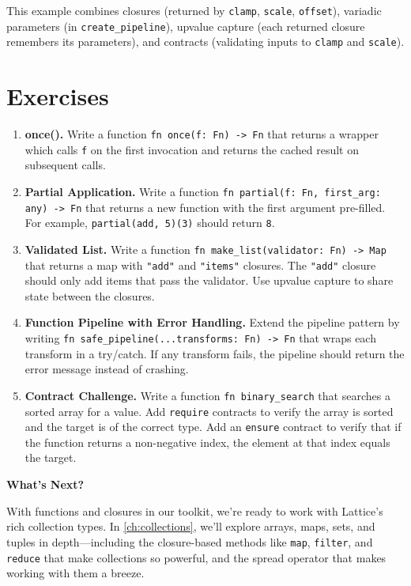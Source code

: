 This example combines closures (returned by \lstinline|clamp|, \lstinline|scale|, \lstinline|offset|), variadic parameters (in \lstinline|create_pipeline|), upvalue capture (each returned closure remembers its parameters), and contracts (validating inputs to \lstinline|clamp| and \lstinline|scale|).

\section{Exercises}\label{sec:functions-exercises}

\begin{enumerate}
  \item \textbf{once().} Write a function \lstinline|fn once(f: Fn) -> Fn| that returns a wrapper which calls \lstinline|f| on the first invocation and returns the cached result on subsequent calls.

  \item \textbf{Partial Application.} Write a function \lstinline|fn partial(f: Fn, first_arg: any) -> Fn| that returns a new function with the first argument pre-filled. For example, \lstinline|partial(add, 5)(3)| should return \lstinline|8|.

  \item \textbf{Validated List.} Write a function \lstinline|fn make_list(validator: Fn) -> Map| that returns a map with \lstinline|"add"| and \lstinline|"items"| closures. The \lstinline|"add"| closure should only add items that pass the validator. Use upvalue capture to share state between the closures.

  \item \textbf{Function Pipeline with Error Handling.} Extend the pipeline pattern by writing \lstinline|fn safe_pipeline(...transforms: Fn) -> Fn| that wraps each transform in a try/catch. If any transform fails, the pipeline should return the error message instead of crashing.

  \item \textbf{Contract Challenge.} Write a function \lstinline|fn binary_search| that searches a sorted array for a value. Add \lstinline|require| contracts to verify the array is sorted and the target is of the correct type. Add an \lstinline|ensure| contract to verify that if the function returns a non-negative index, the element at that index equals the target.
\end{enumerate}

\vspace{1em}
\noindent\textbf{What's Next?}

With functions and closures in our toolkit, we're ready to work with Lattice's rich collection types. In \cref{ch:collections}, we'll explore arrays, maps, sets, and tuples in depth---including the closure-based methods like \lstinline|map|, \lstinline|filter|, and \lstinline|reduce| that make collections so powerful, and the spread operator that makes working with them a breeze.
